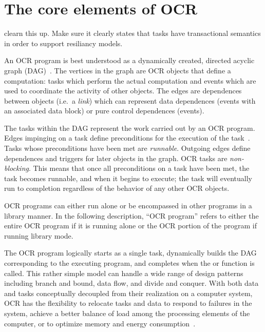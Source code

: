 %

\section{The core elements of OCR}
\label{sec:OCRElements}

clearn this up.  Make sure it clearly states that tasks have transactional semantics
in order to support resiliancy models.

An OCR program is best understood as a dynamically created,
directed acyclic graph
(DAG)~\cite{TaSa11,Tasirlar11,Zuckerman:2011:UCP:2000417.2000424}.
The vertices in the graph are OCR objects that define a computation:
tasks which perform the actual computation and
events which are used to coordinate the
activity of other objects. The edges are dependences between objects
(i.e.\ a \emph{link}) which can represent data dependences (events with
an associated data block) or pure control dependences (events).

The tasks within the DAG represent the work carried out by an OCR
program. Edges impinging on a task define preconditions for the execution of
the task~\cite{SSWS13}. Tasks whose preconditions have been met are
\emph{runnable}. Outgoing edges define dependences and
triggers for later objects in the graph. OCR tasks are
\emph{non-blocking}. This means that once all
preconditions on a task have been met, the task becomes runnable, and
when it begins to execute; the task will eventually run to completion
regardless of the behavior of any other OCR objects.

OCR programs can either run alone or be encompassed in other programs
in a library manner. In the following description, ``OCR program'' refers
to either the entire OCR program if it is running alone or the OCR
portion of the program if running library mode.

The OCR program logically starts as a single task, dynamically builds the
DAG corresponding to the executing program, and completes when the
 or  function is called.
This rather simple model can handle a wide range of
design patterns including branch and bound, data flow, and divide and
conquer.
%
%
With both data and tasks conceptually decoupled from their realization
on a computer system, OCR has the flexibility to relocate tasks and data
to respond to failures in the system, achieve a better balance of load
among the processing elements of the computer, or to optimize memory
and energy consumption~\cite{GZCS10,Guo10,CTBCCGYS13,SbBS14}.

